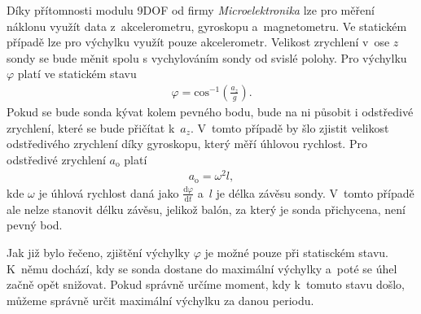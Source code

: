\documentclass[twoside]{ctuthesis}
\newcommand{\diff}{\text{d}}
\theoremstyle{plain}
\theoremstyle{definition}
\theoremstyle{note}
\begin{document}
		Díky přítomnosti modulu 9DOF od firmy \textit{Microelektronika} lze pro měření náklonu využít data z~akcelerometru, gyroskopu a~magnetometru. Ve statickém případě lze pro výchylku využít pouze akcelerometr. Velikost zrychlení v~ose $z$ sondy se bude měnit spolu s vychylováním sondy od svislé polohy. Pro výchylku $\varphi$ platí ve statickém stavu
		\begin{align}
			\varphi = \text{cos}^{-1}\left(\frac{a_z}{g}\right).
		\end{align}
		Pokud se bude sonda kývat kolem pevného bodu, bude na ni působit i odstředivé zrychlení, které se bude přičítat k~$a_z$. V~tomto případě by šlo zjistit velikost odstředivého zrychlení díky gyroskopu, který měří úhlovou rychlost. Pro odstředivé zrychlení $a_\text{o}$ platí
		\begin{align}
			a_\text{o} = \omega^2 l,
		\end{align}
		kde $\omega$ je úhlová rychlost daná jako $\frac{\diff \varphi}{\diff t}$ a~$l$ je délka závěsu sondy. V~tomto případě ale nelze stanovit délku závěsu, jelikož balón, za který je sonda přichycena, není pevný bod.

		Jak již bylo řečeno, zjištění výchylky $\varphi$ je možné pouze při statisckém stavu. K~němu dochází, kdy se sonda dostane do maximální výchylky a~poté se úhel začně opět snižovat. Pokud správně určíme moment, kdy k~tomuto stavu došlo, můžeme správně určit maximální výchylku za danou periodu. 
\end{document}
